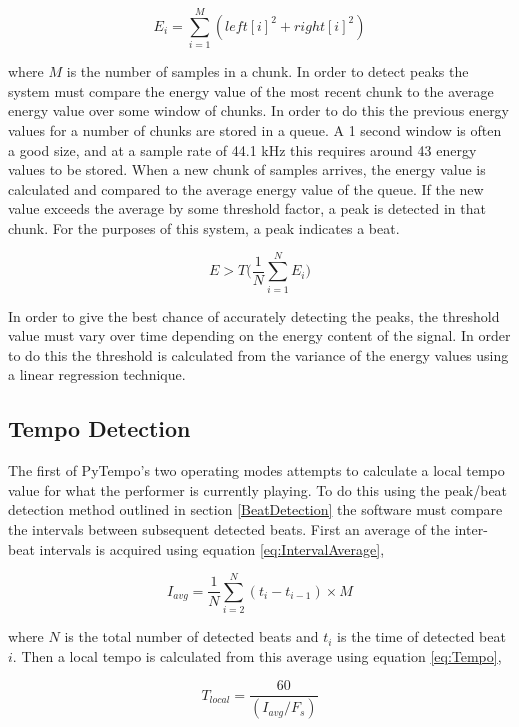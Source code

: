 \documentclass[hidelinks,12pt]{article}
\begin{document}
\begin{equation} \label{eq:EnergySum}
	E_i = \sum_{i=1}^{M}(left[i]^2 + right[i]^2)
\end{equation}

where $M$ is the number of samples in a chunk. In order to detect peaks the system must compare the energy value of the most recent chunk to the average energy value over some window of chunks. In order to do this the previous energy values for a number of chunks are stored in a queue. A 1 second window is often a good size, and at a sample rate of 44.1 kHz this requires around 43 energy values to be stored. When a new chunk of samples arrives, the energy value is calculated and compared to the average energy value of the queue. If the new value exceeds the average by some threshold factor, a peak is detected in that chunk. For the purposes of this system, a peak indicates a beat.

\begin{equation}
	E > T\Bigg(\frac{1}{N}\sum_{i=1}^{N}E_i\Bigg)
\end{equation}

In order to give the best chance of accurately detecting the peaks, the threshold value must vary over time depending on the energy content of the signal. In order to do this the threshold is calculated from the variance of the energy values using a linear regression technique.

\subsection{Tempo Detection}
The first of PyTempo's two operating modes attempts to calculate a local tempo value for what the performer is currently playing. To do this using the peak/beat detection method outlined in section  \ref{BeatDetection} the software must compare the intervals between subsequent detected beats. First an average of the inter-beat intervals is acquired using equation \ref{eq:IntervalAverage},

\begin{equation} \label{eq:IntervalAverage}
	I_{avg} = \frac{1}{N}\sum_{i=2}^{N}(t_i - t_{i-1}) \times M
\end{equation}

where $N$ is the total number of detected beats and $t_i$ is the time of detected beat $i$. Then a local tempo is calculated from this average using equation \ref{eq:Tempo},

\begin{equation} \label{eq:Tempo}
	T_{local} = \frac{60}{(I_{avg} / F_s)}
\end{equation}
\end{document}

